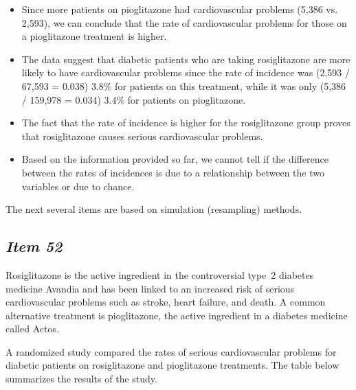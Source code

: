 \begin{itemize}


\item Since more patients on pioglitazone had cardiovascular problems (5,386 vs. 2,593), we can conclude that the rate of cardiovascular problems for those on a pioglitazone treatment is higher.


\item The data suggest that diabetic patients who are taking rosiglitazone are more likely to have cardiovascular problems since the rate of incidence was (2,593 / 67,593 = 0.038) 3.8\% for patients on this treatment, while it was only (5,386 / 159,978 = 0.034) 3.4\% for patients on pioglitazone.


\item The fact that the rate of incidence is higher for the rosiglitazone group proves that rosiglitazone causes serious cardiovascular problems.


\item Based on the information provided so far, we cannot tell if the difference between the rates of incidences is due to a relationship between the two variables or due to chance.


\end{itemize}



\vspace{.1in}

The next several items are based on simulation (resampling) methods.

\subsection{\textbf{\textit{Item 52}}} 








Rosiglitazone is the active ingredient in the controversial type~2 diabetes medicine Avandia and has been linked to an increased risk of serious cardiovascular problems such as stroke, heart failure, and death. A common alternative treatment is pioglitazone, the active ingredient in a diabetes medicine called Actos. 


A randomized study compared the rates of serious cardiovascular problems for diabetic patients on rosiglitazone and pioglitazone treatments. The table below summarizes the results of the study.


